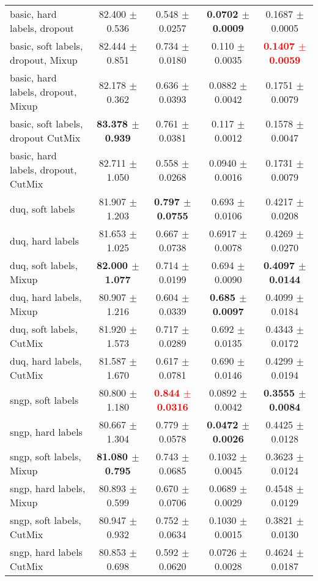 \documentclass{article}
\begin{document}
\begin{table}[ht]
{\begin{tabular}{lcccc}
basic, hard labels, dropout  & 82.400 $\pm$ 0.536 & 0.548 $\pm$ 0.0257 & \textbf{0.0702 $\pm$ 0.0009} & 0.1687 $\pm$ 0.0005 \\
basic, soft labels, dropout, Mixup  & 82.444 $\pm$ 0.851 & 0.734 $\pm$ 0.0180 & 0.110 $\pm$ 0.0035 & \textbf{\textcolor{red}{0.1407 $\pm$ 0.0059}} \\
basic, hard labels, dropout, Mixup  & 82.178 $\pm$ 0.362 & 0.636 $\pm$ 0.0393 & 0.0882 $\pm$ 0.0042 & 0.1751 $\pm$ 0.0079 \\
basic, soft labels, dropout CutMix & \textbf{83.378 $\pm$ 0.939} & 0.761 $\pm$ 0.0381 & 0.117 $\pm$ 0.0012 & 0.1578 $\pm$ 0.0047 \\
basic, hard labels, dropout, CutMix & 82.711 $\pm$ 1.050 & 0.558 $\pm$ 0.0268 & 0.0940 $\pm$ 0.0016 & 0.1731 $\pm$ 0.0079 \\
\midrule
duq, soft labels & 81.907 $\pm$ 1.203 & \textbf{0.797 $\pm$ 0.0755} & 0.693 $\pm$ 0.0106 & 0.4217 $\pm$ 0.0208 \\
duq, hard labels & 81.653 $\pm$ 1.025 & 0.667 $\pm$ 0.0738 & 0.6917 $\pm$ 0.0078 & 0.4269 $\pm$ 0.0270 \\
duq, soft labels, Mixup & \textbf{82.000 $\pm$ 1.077} & 0.714 $\pm$ 0.0199 & 0.694 $\pm$ 0.0090 & \textbf{0.4097 $\pm$ 0.0144} \\
duq, hard labels, Mixup & 80.907 $\pm$ 1.216 & 0.604 $\pm$ 0.0339 & \textbf{0.685 $\pm$ 0.0097} & 0.4099 $\pm$ 0.0184 \\
duq, soft labels, CutMix & 81.920 $\pm$ 1.573 & 0.717 $\pm$ 0.0289 & 0.692 $\pm$ 0.0135 & 0.4343 $\pm$ 0.0172 \\
duq, hard labels, CutMix & 81.587 $\pm$ 1.670 & 0.617 $\pm$ 0.0781 & 0.690 $\pm$ 0.0146 & 0.4299 $\pm$ 0.0194 \\
\midrule
sngp, soft labels  & 80.800 $\pm$ 1.180 & \textbf{\textcolor{red}{0.844 $\pm$ 0.0316}} & 0.0892 $\pm$ 0.0042 & \textbf{0.3555 $\pm$ 0.0084} \\
sngp, hard labels  & 80.667 $\pm$ 1.304 & 0.779 $\pm$ 0.0578 & \textbf{0.0472 $\pm$ 0.0026} & 0.4425 $\pm$ 0.0128 \\
sngp, soft labels,  Mixup  & \textbf{81.080 $\pm$ 0.795} & 0.743 $\pm$ 0.0685 & 0.1032 $\pm$ 0.0045 & 0.3623 $\pm$ 0.0124 \\
sngp, hard labels,  Mixup  & 80.893 $\pm$ 0.599 & 0.670 $\pm$ 0.0706 & 0.0689 $\pm$ 0.0029 & 0.4548 $\pm$ 0.0129 \\
sngp, soft labels, CutMix & 80.947 $\pm$ 0.932 & 0.752 $\pm$ 0.0634 & 0.1030 $\pm$ 0.0015 & 0.3821 $\pm$ 0.0130 \\
sngp, hard labels CutMix & 80.853 $\pm$ 0.698 & 0.592 $\pm$ 0.0620 & 0.0726 $\pm$ 0.0028 & 0.4624 $\pm$ 0.0187 \\
\bottomrule
\end{tabular}%
}
\label{tab:model_comparison}
\end{table}
\end{document}
